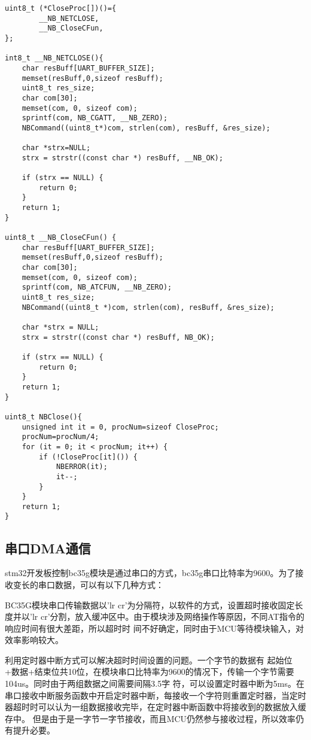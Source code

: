 \begin{lstlisting}
uint8_t (*CloseProc[])()={
        __NB_NETCLOSE,
        __NB_CloseCFun,
};

int8_t __NB_NETCLOSE(){
    char resBuff[UART_BUFFER_SIZE];
    memset(resBuff,0,sizeof resBuff);
    uint8_t res_size;
    char com[30];
    memset(com, 0, sizeof com);
    sprintf(com, NB_CGATT, __NB_ZERO);
    NBCommand((uint8_t*)com, strlen(com), resBuff, &res_size);

    char *strx=NULL;
    strx = strstr((const char *) resBuff, __NB_OK);

    if (strx == NULL) {
        return 0;
    }
    return 1;
}

uint8_t __NB_CloseCFun() {
    char resBuff[UART_BUFFER_SIZE];
    memset(resBuff,0,sizeof resBuff);
    char com[30];
    memset(com, 0, sizeof com);
    sprintf(com, NB_ATCFUN, __NB_ZERO);
    uint8_t res_size;
    NBCommand((uint8_t *)com, strlen(com), resBuff, &res_size);

    char *strx = NULL;
    strx = strstr((const char *) resBuff, NB_OK);

    if (strx == NULL) {
        return 0;
    }
    return 1;
}

uint8_t NBClose(){
    unsigned int it = 0, procNum=sizeof CloseProc;
    procNum=procNum/4;
    for (it = 0; it < procNum; it++) {
        if (!CloseProc[it]()) {
            NBERROR(it);
            it--;
        }
    }
    return 1;
}
\end{lstlisting}

\subsection{串口DMA通信}

stm32开发板控制bc35g模块是通过串口的方式，bc35g串口比特率为9600。为了接收变长的串口数据，可以有以下几种方式：

BC35G模块串口传输数据以'lr cr'为分隔符，以软件的方式，设置超时接收固定长度并以'lr cr'分割，放入缓冲区中。由于模块涉及网络操作等原因，不同AT指令的响应时间有很大差距，所以超时时
间不好确定，同时由于MCU等待模块输入，对效率影响较大。

利用定时器中断方式可以解决超时时间设置的问题。一个字节的数据有 起始位+数据+结束位共10位，在模块串口比特率为9600的情况下，传输一个字节需要104us。同时由于两组数据之间需要间隔3.5字
符，可以设置定时器中断为5ms。在串口接收中断服务函数中开启定时器中断，每接收一个字符则重置定时器，当定时器超时时可以认为一组数据接收完毕，在定时器中断函数中将接收到的数据放入缓存中。
但是由于是一字节一字节接收，而且MCU仍然参与接收过程，所以效率仍有提升必要。

